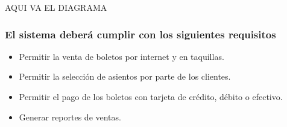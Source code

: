 \begin{center}
    AQUI VA EL DIAGRAMA 
\end{center}

\subsubsection*{El sistema deberá cumplir con los siguientes requisitos}
\begin{itemize}
    \item Permitir la venta de boletos por internet y en taquillas.
    \item Permitir la selección de asientos por parte de los clientes.
    \item Permitir el pago de los boletos con tarjeta de crédito, débito o efectivo.
    \item Generar reportes de ventas.
\end{itemize}

